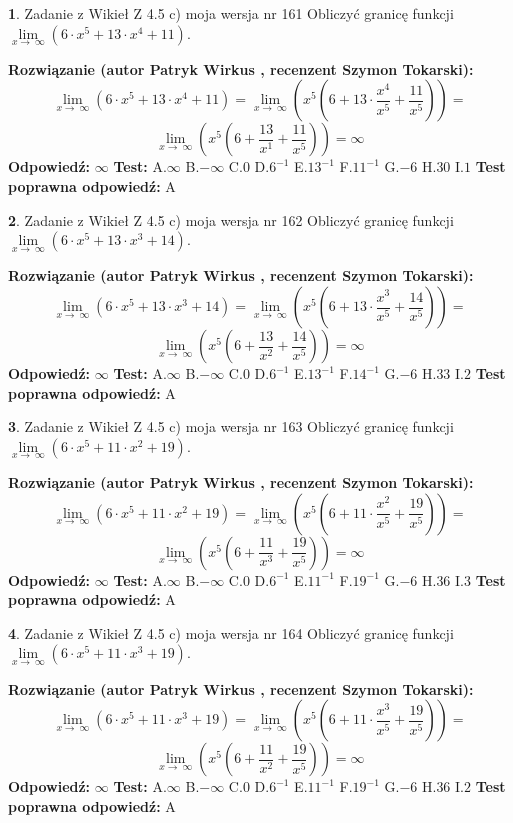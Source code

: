 \documentclass[12pt, a4paper]{article}
\theoremstyle{definition} %
\newtheorem{zad}{}
\newcommand{\zadStart}[1]{\begin{zad}#1\newline}
\newcommand{\zadStop}{\end{zad}}
\newcommand{\rozwStart}[2]{\noindent \textbf{Rozwiązanie (autor #1 , recenzent #2): }\newline}
\newcommand{\rozwStop}{\newline}
\newcommand{\odpStart}{\noindent \textbf{Odpowiedź:}\newline}
\newcommand{\odpStop}{\newline}
\newcommand{\testStart}{\noindent \textbf{Test:}\newline}
\newcommand{\testStop}{\newline}
\newcommand{\kluczStart}{\noindent \textbf{Test poprawna odpowiedź:}\newline}
\newcommand{\kluczStop}{\newline}
\begin{document}
\zadStart{Zadanie z Wikieł Z 4.5 c) moja wersja nr 161}
Obliczyć granicę funkcji  $\lim\limits_{x\to\ \infty}(6 \cdot x^{5}+13 \cdot x^{4}+11)$.
\zadStop
\rozwStart{Patryk Wirkus}{Szymon Tokarski}
$$\lim\limits_{x\to\ \infty}(6 \cdot x^{5}+13 \cdot x^{4}+11) = \lim\limits_{x\to\ \infty}(x^{5}(6 +13 \cdot \frac{x^{4}}{x^{5}}+\frac{11}{x^{5}})) =$$ $$\lim\limits_{x\to\ \infty}(x^{5}(6 +\frac{13}{x^{1}}+\frac{11}{x^{5}})) =\infty$$
\rozwStop
\odpStart
$\infty$
\odpStop
\testStart
A.$\infty$ B.$-\infty$ C.$0$ D.$6^{-1}$ E.$13^{-1}$
F.$11^{-1}$ G.$-6$
H.$30$
I.$1$
\testStop
\kluczStart
A
\kluczStop



\zadStart{Zadanie z Wikieł Z 4.5 c) moja wersja nr 162}
Obliczyć granicę funkcji  $\lim\limits_{x\to\ \infty}(6 \cdot x^{5}+13 \cdot x^{3}+14)$.
\zadStop
\rozwStart{Patryk Wirkus}{Szymon Tokarski}
$$\lim\limits_{x\to\ \infty}(6 \cdot x^{5}+13 \cdot x^{3}+14) = \lim\limits_{x\to\ \infty}(x^{5}(6 +13 \cdot \frac{x^{3}}{x^{5}}+\frac{14}{x^{5}})) =$$ $$\lim\limits_{x\to\ \infty}(x^{5}(6 +\frac{13}{x^{2}}+\frac{14}{x^{5}})) =\infty$$
\rozwStop
\odpStart
$\infty$
\odpStop
\testStart
A.$\infty$ B.$-\infty$ C.$0$ D.$6^{-1}$ E.$13^{-1}$
F.$14^{-1}$ G.$-6$
H.$33$
I.$2$
\testStop
\kluczStart
A
\kluczStop



\zadStart{Zadanie z Wikieł Z 4.5 c) moja wersja nr 163}
Obliczyć granicę funkcji  $\lim\limits_{x\to\ \infty}(6 \cdot x^{5}+11 \cdot x^{2}+19)$.
\zadStop
\rozwStart{Patryk Wirkus}{Szymon Tokarski}
$$\lim\limits_{x\to\ \infty}(6 \cdot x^{5}+11 \cdot x^{2}+19) = \lim\limits_{x\to\ \infty}(x^{5}(6 +11 \cdot \frac{x^{2}}{x^{5}}+\frac{19}{x^{5}})) =$$ $$\lim\limits_{x\to\ \infty}(x^{5}(6 +\frac{11}{x^{3}}+\frac{19}{x^{5}})) =\infty$$
\rozwStop
\odpStart
$\infty$
\odpStop
\testStart
A.$\infty$ B.$-\infty$ C.$0$ D.$6^{-1}$ E.$11^{-1}$
F.$19^{-1}$ G.$-6$
H.$36$
I.$3$
\testStop
\kluczStart
A
\kluczStop



\zadStart{Zadanie z Wikieł Z 4.5 c) moja wersja nr 164}
Obliczyć granicę funkcji  $\lim\limits_{x\to\ \infty}(6 \cdot x^{5}+11 \cdot x^{3}+19)$.
\zadStop
\rozwStart{Patryk Wirkus}{Szymon Tokarski}
$$\lim\limits_{x\to\ \infty}(6 \cdot x^{5}+11 \cdot x^{3}+19) = \lim\limits_{x\to\ \infty}(x^{5}(6 +11 \cdot \frac{x^{3}}{x^{5}}+\frac{19}{x^{5}})) =$$ $$\lim\limits_{x\to\ \infty}(x^{5}(6 +\frac{11}{x^{2}}+\frac{19}{x^{5}})) =\infty$$
\rozwStop
\odpStart
$\infty$
\odpStop
\testStart
A.$\infty$ B.$-\infty$ C.$0$ D.$6^{-1}$ E.$11^{-1}$
F.$19^{-1}$ G.$-6$
H.$36$
I.$2$
\testStop
\kluczStart
A
\kluczStop
\end{document}
